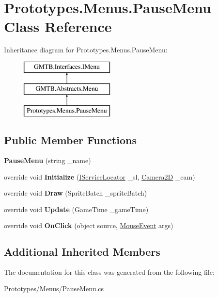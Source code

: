 \hypertarget{class_prototypes_1_1_menus_1_1_pause_menu}{}\section{Prototypes.\+Menus.\+Pause\+Menu Class Reference}
\label{class_prototypes_1_1_menus_1_1_pause_menu}
Inheritance diagram for Prototypes.\+Menus.\+Pause\+Menu\+:\begin{figure}[H]
\begin{center}
\leavevmode
\includegraphics[height=3.000000cm]{class_prototypes_1_1_menus_1_1_pause_menu}
\end{center}
\end{figure}
\subsection*{Public Member Functions}
\begin{DoxyCompactItemize}
\item 
\mbox{\label{class_prototypes_1_1_menus_1_1_pause_menu_a1f003996baf098cc5a2e9a65c6451e25}} 
{\bfseries Pause\+Menu} (string \+\_\+name)
\item 
\mbox{\label{class_prototypes_1_1_menus_1_1_pause_menu_a93cd60eae93e414454969dfcfa47b26b}} 
override void {\bfseries Initialize} (\mbox{\hyperlink{interface_g_m_t_b_1_1_interfaces_1_1_i_service_locator}{I\+Service\+Locator}} \+\_\+sl, \mbox{\hyperlink{class_g_m_t_b_1_1_camera2_d}{Camera2D}} \+\_\+cam)
\item 
\mbox{\label{class_prototypes_1_1_menus_1_1_pause_menu_a2808b65b67d9064bcdbfd7f42682192b}} 
override void {\bfseries Draw} (Sprite\+Batch \+\_\+sprite\+Batch)
\item 
\mbox{\label{class_prototypes_1_1_menus_1_1_pause_menu_ae441cbe91e3f204db56a68a32dd7014b}} 
override void {\bfseries Update} (Game\+Time \+\_\+game\+Time)
\item 
\mbox{\label{class_prototypes_1_1_menus_1_1_pause_menu_af1dbf65c4bbedb0a6db6b91fa72c6450}} 
override void {\bfseries On\+Click} (object source, \mbox{\hyperlink{class_g_m_t_b_1_1_input_system_1_1_mouse_event}{Mouse\+Event}} args)
\end{DoxyCompactItemize}
\subsection*{Additional Inherited Members}


The documentation for this class was generated from the following file\+:\begin{DoxyCompactItemize}
\item 
Prototypes/\+Menus/Pause\+Menu.\+cs\end{DoxyCompactItemize}
